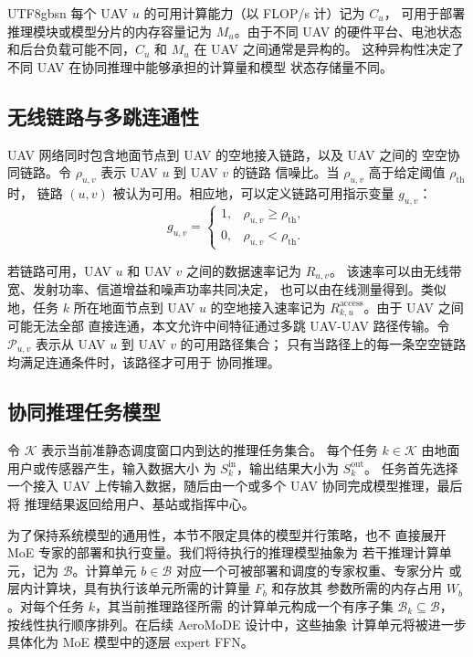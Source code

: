 \documentclass[conference]{IEEEtran}
\begin{document}
\begin{CJK*}{UTF8}{gbsn}
每个 UAV $u$ 的可用计算能力（以 FLOP/s 计）记为 $C_u$，
可用于部署推理模块或模型分片的内存容量记为 $M_u$。由于不同 UAV 的硬件平台、电池状态
和后台负载可能不同，$C_u$ 和 $M_u$ 在 UAV 之间通常是异构的。
这种异构性决定了不同 UAV 在协同推理中能够承担的计算量和模型
状态存储量不同。

\subsection{无线链路与多跳连通性}

UAV 网络同时包含地面节点到 UAV 的空地接入链路，以及 UAV 之间的
空空协同链路。令 $\rho_{u,v}$ 表示 UAV $u$ 到 UAV $v$ 的链路
信噪比。当 $\rho_{u,v}$ 高于给定阈值 $\rho_{\mathrm{th}}$ 时，
链路 $(u,v)$ 被认为可用。相应地，可以定义链路可用指示变量
$g_{u,v}$：
\begin{equation}
g_{u,v} =
\begin{cases}
1, & \rho_{u,v} \ge \rho_{\mathrm{th}},\\
0, & \rho_{u,v} < \rho_{\mathrm{th}}.
\end{cases}
\end{equation}

若链路可用，UAV $u$ 和 UAV $v$ 之间的数据速率记为 $R_{u,v}$。
该速率可以由无线带宽、发射功率、信道增益和噪声功率共同决定，
也可以由在线测量得到。类似地，任务 $k$ 所在地面节点到 UAV $u$
的空地接入速率记为 $R_{k,u}^{\mathrm{access}}$。由于 UAV 之间可能无法全部
直接连通，本文允许中间特征通过多跳 UAV-UAV 路径传输。令
$\mathcal{P}_{u,v}$ 表示从 UAV $u$ 到 UAV $v$ 的可用路径集合；
只有当路径上的每一条空空链路均满足连通条件时，该路径才可用于
协同推理。

\subsection{协同推理任务模型}

令 $\mathcal{K}$ 表示当前准静态调度窗口内到达的推理任务集合。
每个任务 $k\in\mathcal{K}$ 由地面用户或传感器产生，输入数据大小
为 $S_k^{\mathrm{in}}$，输出结果大小为 $S_k^{\mathrm{out}}$。
任务首先选择一个接入 UAV
上传输入数据，随后由一个或多个 UAV 协同完成模型推理，最后将
推理结果返回给用户、基站或指挥中心。

为了保持系统模型的通用性，本节不限定具体的模型并行策略，也不
直接展开 MoE 专家的部署和执行变量。我们将待执行的推理模型抽象为
若干推理计算单元，记为 $\mathcal{B}$。计算单元
$b\in\mathcal{B}$ 对应一个可被部署和调度的专家权重、专家分片
或层内计算块，具有执行该单元所需的计算量 $F_b$ 和存放其
参数所需的内存占用 $W_b$。对每个任务 $k$，其当前推理路径所需
的计算单元构成一个有序子集 $\mathcal{B}_k\subseteq\mathcal{B}$，
按线性执行顺序排列。在后续 AeroMoDE 设计中，这些抽象
计算单元将被进一步具体化为 MoE 模型中的逐层 expert FFN。


\end{CJK*}
\end{document}

